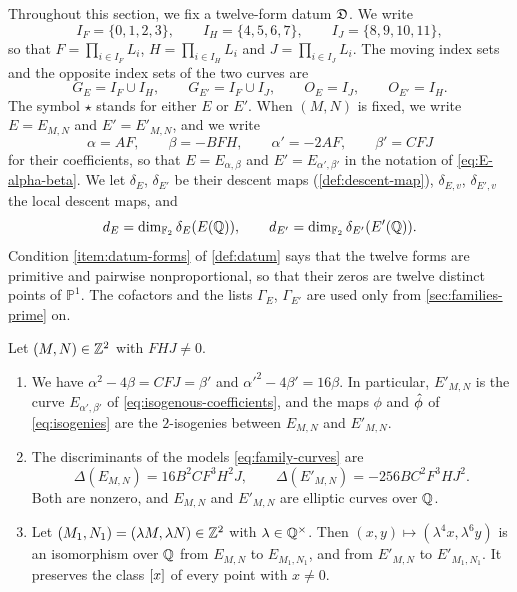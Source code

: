 Throughout this section, we fix a twelve-form datum $\mathfrak D$. We write
\begin{equation}\label{eq:index-sets}
I_F=\{0,1,2,3\},\qquad I_H=\{4,5,6,7\},\qquad I_J=\{8,9,10,11\},
\end{equation}
so that $F=\prod_{i\in I_F}L_i$, $H=\prod_{i\in I_H}L_i$ and $J=\prod_{i\in I_J}L_i$. The moving index sets and the opposite index sets of the two curves are
\begin{equation}\label{eq:moving-sets}
G_E=I_F\cup I_H,\qquad G_{E'}=I_F\cup I_J,\qquad O_E=I_J,\qquad O_{E'}=I_H.
\end{equation}
The symbol $\star$ stands for either $E$ or $E'$. When $(M,N)$ is fixed, we write $E=E_{M,N}$ and $E'=E'_{M,N}$, and we write
\begin{equation}\label{eq:family-coefficients}
\alpha=AF,\qquad\beta=-BFH,\qquad\alpha'=-2AF,\qquad\beta'=CFJ
\end{equation}
for their coefficients, so that $E=E_{\alpha,\beta}$ and $E'=E_{\alpha',\beta'}$ in the notation of \eqref{eq:E-alpha-beta}. We let $\delta_E$, $\delta_{E'}$ be their descent maps (\cref{def:descent-map}), $\delta_{E,v}$, $\delta_{E',v}$ the local descent maps, and
\begin{equation}\label{eq:dE-dEprime}
d_E=\dim_{\mathbb F_2}\delta_E(E(\mathbb Q)),\qquad d_{E'}=\dim_{\mathbb F_2}\delta_{E'}(E'(\mathbb Q)).
\end{equation}
Condition \ref{item:datum-forms} of \cref{def:datum} says that the twelve forms are primitive and pairwise nonproportional, so that their zeros are twelve distinct points of $\mathbb P^1$. The cofactors and the lists $\Gamma_E$, $\Gamma_{E'}$ are used only from \cref{sec:families-prime} on.

\begin{lemma}\label{lem:datum-basic}
Let $(M,N)\in\mathbb Z^2$ with $FHJ\ne0$.
\begin{enumerate}[label=(\alph*),ref=(\alph*)]
\item\label{item:datum-basic-dual} We have $\alpha^2-4\beta=CFJ=\beta'$ and $\alpha'^2-4\beta'=16\beta$. In particular, $E'_{M,N}$ is the curve $E_{\alpha',\beta'}$ of \eqref{eq:isogenous-coefficients}, and the maps $\phi$ and $\hat\phi$ of \eqref{eq:isogenies} are the $2$-isogenies between $E_{M,N}$ and $E'_{M,N}$.
\item\label{item:datum-basic-disc} The discriminants of the models \eqref{eq:family-curves} are
\begin{equation}\label{eq:family-discriminants}
\Delta(E_{M,N})=16B^2CF^3H^2J,\qquad\Delta(E'_{M,N})=-256BC^2F^3HJ^2.
\end{equation}
Both are nonzero, and $E_{M,N}$ and $E'_{M,N}$ are elliptic curves over $\mathbb Q$.
\item\label{item:datum-basic-scaling} Let $(M_1,N_1)=(\lambda M,\lambda N)\in\mathbb Z^2$ with $\lambda\in\mathbb Q^\times$. Then $(x,y)\mapsto(\lambda^4x,\lambda^6y)$ is an isomorphism over $\mathbb Q$ from $E_{M,N}$ to $E_{M_1,N_1}$, and from $E'_{M,N}$ to $E'_{M_1,N_1}$. It preserves the class $[x]$ of every point with $x\ne0$.
\end{enumerate}
\end{lemma}

